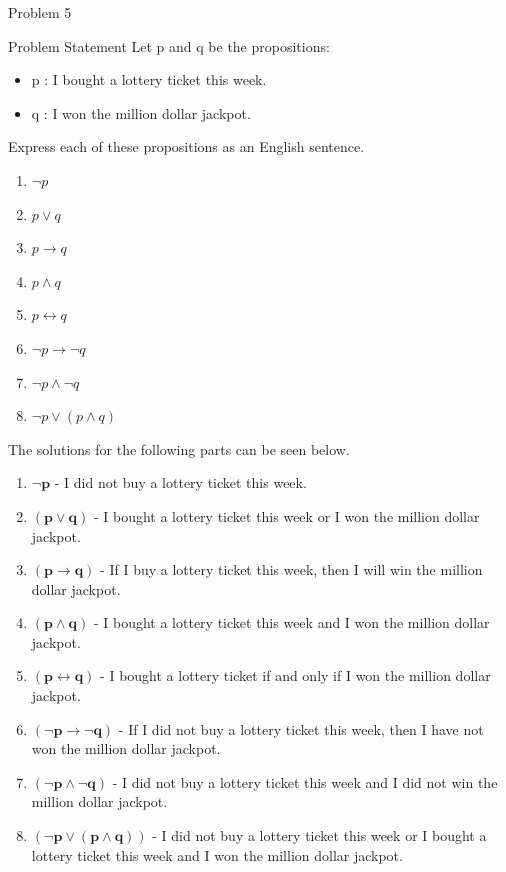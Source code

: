\begin{problem}{Problem 5}
    \begin{statement}{Problem Statement}
        Let p and q be the propositions:

        \begin{itemize}
            \item p : I bought a lottery ticket this week.
            \item q : I won the million dollar jackpot.
        \end{itemize}

        Express each of these propositions as an English sentence.

        \begin{enumerate}[label=(\alph*)]
            \item $\neg p$
            \item $p \vee q$
            \item $p \rightarrow q$
            \item $p \wedge q$
            \item $p \leftrightarrow q$
            \item $\neg p \rightarrow \neg q$
            \item $\neg p \wedge \neg q$
            \item $\neg p \vee (p \wedge q)$
        \end{enumerate}
    \end{statement}

    \begin{highlight}
        The solutions for the following parts can be seen below.
        \begin{enumerate}[label=(\alph*)]
            \item $\mathbf{\neg p}$ - I did not buy a lottery ticket this week.
            \item $\mathbf{(p \vee q)}$ - I bought a lottery ticket this week or I won the million dollar jackpot.
            \item $\mathbf{(p \rightarrow q)}$ - If I buy a lottery ticket this week, then I will win the million dollar jackpot.
            \item $\mathbf{(p \wedge q)}$ - I bought a lottery ticket this week and I won the million dollar jackpot.
            \item $\mathbf{(p \leftrightarrow q)}$ - I bought a lottery ticket if and only if I won the million dollar jackpot.
            \item $\mathbf{(\neg p \rightarrow \neg q)}$ - If I did not buy a lottery ticket this week, then I have not won the million dollar jackpot.
            \item $\mathbf{(\neg p \wedge \neg q)}$ - I did not buy a lottery ticket this week and I did not win the million dollar jackpot.
            \item $\mathbf{(\neg p \vee (p \wedge q))}$ - I did not buy a lottery ticket this week or I bought a lottery ticket this week and I won the million dollar jackpot.
        \end{enumerate}
    \end{highlight}
\end{problem}

